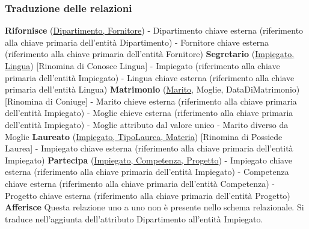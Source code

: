 \documentclass{article}
\begin{document}
\subsubsection{Traduzione delle relazioni}
\textbf{Rifornisce} (\underline{Dipartimento, Fornitore})
\newline
- Dipartimento chiave esterna (riferimento alla chiave primaria dell'entità Dipartimento)
\newline
- Fornitore chiave esterna (riferimento alla chiave primaria dell'entità Fornitore)
\newline
\newline
\textbf{Segretario} (\underline{Impiegato, Lingua}) [Rinomina di Conosce Lingua]
\newline
- Impiegato (riferimento alla chiave primaria dell'entità Impiegato)
\newline
- Lingua chiave esterna (riferimento alla chiave primaria dell'entità Lingua)
\newline
\newline
\textbf{Matrimonio} (\underline{Marito}, Moglie, DataDiMatrimonio) [Rinomina di Coniuge]
\newline
- Marito chieve esterna (riferimento alla chiave primaria dell'entità Impiegato)
\newline
- Moglie chieve esterna (riferimento alla chiave primaria dell'entità Impiegato)
\newline
- Moglie attributo dal valore unico
\newline
- Marito diverso da Moglie
\newline
\newline
\textbf{Laureato} (\underline{Impiegato, TipoLaurea, Materia}) [Rinomina di Possiede Laurea]
\newline
- Impiegato chiave esterna (riferimento alla chiave primaria dell'entità Impiegato)
\newline
\newline
\textbf{Partecipa} (\underline{Impiegato, Competenza, Progetto})
\newline
- Impiegato chiave esterna (riferimento alla chiave primaria dell'entità Impiegato)
\newline
- Competenza chiave esterna (riferimento alla chiave primaria dell'entità Competenza)
\newline
- Progetto chiave esterna (riferimento alla chiave primaria dell'entità Progetto)
\newline
\newline
\textbf{Afferisce}
\newline
Questa relazione uno a uno non è presente nello schema relazionale.
\newline
Si traduce nell'aggiunta dell'attributo Dipartimento all'entità Impiegato.
\end{document}
